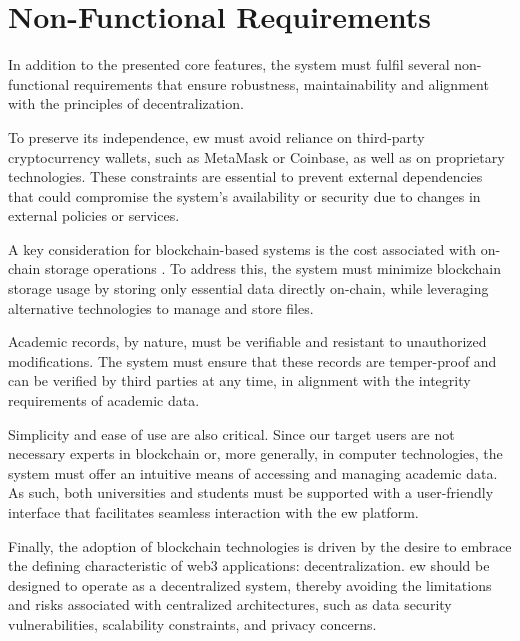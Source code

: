 \section{Non-Functional Requirements}
\label{sec:nonFunctionalRequirements}
In addition to the presented core features, the system must fulfil several non-functional requirements that ensure robustness, maintainability and alignment with the principles of decentralization. 

To preserve its independence, \acrshort{ew} must avoid reliance on third-party cryptocurrency wallets, such as MetaMask or Coinbase, as well as on proprietary technologies. These constraints are essential to prevent external dependencies that could compromise the system’s availability or security due to changes in external policies or services.

A key consideration for blockchain-based systems is the cost associated with on-chain storage operations \cite{surya2024designdecentralizedidentity}. To address this, the system must minimize blockchain storage usage by storing only essential data directly on-chain, while leveraging alternative technologies to manage and store files.

Academic records, by nature, must be verifiable and resistant to unauthorized modifications. The system must ensure that these records are temper-proof and can be verified by third parties at any time, in alignment with the integrity requirements of academic data.

Simplicity and ease of use are also critical. Since our target users are not necessary experts in blockchain or, more generally, in computer technologies, the system must offer an intuitive means of accessing and managing academic data. As such, both universities and students must be supported with a user-friendly interface that facilitates seamless interaction with the \acrshort{ew} platform.

Finally, the adoption of blockchain technologies is driven by the desire to embrace the defining characteristic of \Gls{web3} applications: decentralization. \acrshort{ew} should be designed to operate as a decentralized system, thereby avoiding the limitations and risks associated with centralized architectures, such as data security vulnerabilities, scalability constraints, and privacy concerns. %

